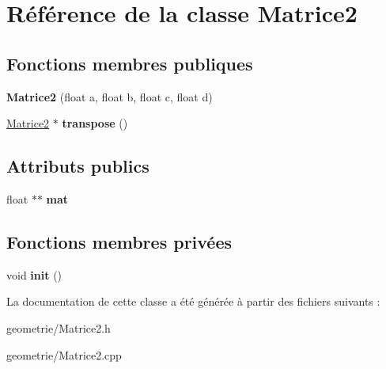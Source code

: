 \hypertarget{class_matrice2}{\section{Référence de la classe Matrice2}
\label{class_matrice2}
}
\subsection*{Fonctions membres publiques}
\begin{DoxyCompactItemize}
\item 
\hypertarget{class_matrice2_a83a70ba4858f14e89c5287ec59ae96d0}{{\bfseries Matrice2} (float a, float b, float c, float d)}\label{class_matrice2_a83a70ba4858f14e89c5287ec59ae96d0}

\item 
\hypertarget{class_matrice2_a4a5e8561a8616485fc492ec569429eb2}{\hyperlink{class_matrice2}{Matrice2} $\ast$ {\bfseries transpose} ()}\label{class_matrice2_a4a5e8561a8616485fc492ec569429eb2}

\end{DoxyCompactItemize}
\subsection*{Attributs publics}
\begin{DoxyCompactItemize}
\item 
\hypertarget{class_matrice2_aa249f4f1243999d731ab48889272cb70}{float $\ast$$\ast$ {\bfseries mat}}\label{class_matrice2_aa249f4f1243999d731ab48889272cb70}

\end{DoxyCompactItemize}
\subsection*{Fonctions membres privées}
\begin{DoxyCompactItemize}
\item 
\hypertarget{class_matrice2_a04fc6ee0ed98d9a76cb6fffb8ea52168}{void {\bfseries init} ()}\label{class_matrice2_a04fc6ee0ed98d9a76cb6fffb8ea52168}

\end{DoxyCompactItemize}


La documentation de cette classe a été générée à partir des fichiers suivants \-:\begin{DoxyCompactItemize}
\item 
geometrie/Matrice2.\-h\item 
geometrie/Matrice2.\-cpp\end{DoxyCompactItemize}
